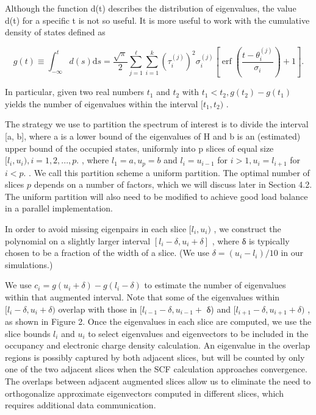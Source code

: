 \documentclass[
  10
]{article}
\begin{document}
Although the function d(t) describes the distribution of eigenvalues,
the value d(t) for a specific t is not so useful. It is more useful to
work with the cumulative density of states defined as

\[
g (t) \equiv \int_ {- \infty} ^ {t} d (s) \mathrm{d} s = \frac {\sqrt {\pi}}{2} \sum_ {j = 1} ^ {\ell} \sum_ {i = 1} ^ {k} (\tau_ {i} ^ {(j)}) ^ {2} \sigma_ {i} ^ {(j)} \left[ \operatorname{erf} \left(\frac {t - \theta_ {i} ^ {(j)}}{\sigma_ {i}}\right) + 1 \right]. \tag {6}
\]

In particular, given two real numbers \(t _ { 1 }\) and \(t _ { 2 }\)
with \(t _ { 1 } < t _ { 2 } , g ( t _ { 2 } ) - g ( t _ { 1 } )\)
yields the number of eigenvalues within the interval
\([ t _ { 1 } , t _ { 2 } )\) .

The strategy we use to partition the spectrum of interest is to divide
the interval {[}a, b{]}, where a is a lower bound of the eigenvalues of
H and b is an (estimated) upper bound of the occupied states, uniformly
into p slices of equal size
\([ l _ { i } , u _ { i } ) , i = 1 , 2 , . . . , p .\) , where
\(l _ { 1 } = a , u _ { p } = b\) and \(l _ { i } = u _ { i - 1 }\) for
\(i > 1 , u _ { i } = l _ { i + 1 }\) for \(i < p .\) . We call this
partition scheme a uniform partition. The optimal number of slices \(p\)
depends on a number of factors, which we will discuss later in Section
4.2. The uniform partition will also need to be modified to achieve good
load balance in a parallel implementation.

In order to avoid missing eigenpairs in each slice
\([ l _ { i } , u _ { i } )\) , we construct the polynomial on a
slightly larger interval \([ l _ { i } - \delta , u _ { i } + \delta ]\)
, where δ is typically chosen to be a fraction of the width of a slice.
(We use \(\delta = ( u _ { i } - l _ { i } ) / 1 0\) in our
simulations.)

We use
\(c _ { i } = g ( u _ { i } + \delta ) - g ( l _ { i } - \delta )\) to
estimate the number of eigenvalues within that augmented interval. Note
that some of the eigenvalues within
\([ l _ { i } - \delta , u _ { i } + \delta )\) overlap with those in
\([ l _ { i - 1 } - \delta , u _ { i - 1 } +\) δ) and
\([ l _ { i + 1 } - \delta , u _ { i + 1 } + \delta )\) , as shown in
Figure 2. Once the eigenvalues in each slice are computed, we use the
slice bounds \(l _ { i }\) and \(u _ { i }\) to select eigenvalues and
eigenvectors to be included in the occupancy and electronic charge
density calculation. An eigenvalue in the overlap regions is possibly
captured by both adjacent slices, but will be counted by only one of the
two adjacent slices when the SCF calculation approaches convergence. The
overlaps between adjacent augmented slices allow us to eliminate the
need to orthogonalize approximate eigenvectors computed in different
slices, which requires additional data communication.
\end{document}
